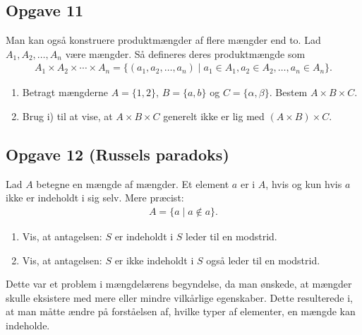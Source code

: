 \subsection*{Opgave 11}
Man kan også konstruere produktmængder af flere mængder end to. Lad $A_1,A_2,\hdots, A_n$ være mængder. Så defineres deres produktmængde som
\begin{align*}
	A_1 \times A_2 \times \cdots \times A_n = \{(a_1,a_2,\hdots,a_n) \mid a_1 \in A_1,a_2\in A_2, \hdots, a_n \in A_n\}.
\end{align*}
\begin{enumerate}[label=\roman*)]
	\item Betragt mængderne $A = \{1,2\}$, $B= \{a,b\}$ og $C = \{\alpha,\beta\}.$ Bestem $A\times B \times C$.
	\item Brug i) til at vise, at $A\times B \times C$ generelt ikke er lig med $(A \times B) \times C$.
\end{enumerate}
\subsection*{Opgave 12 (Russels paradoks)}
Lad $A$ betegne en mængde af mængder. Et element $a$ er i $A$, hvis og kun hvis $a$ ikke er indeholdt i sig selv. Mere præcist:
\begin{align*}
	A = \{a \mid a \notin a\}.
\end{align*}
\begin{enumerate}[label = \roman*)]
	\item Vis, at antagelsen: $S$ er indeholdt i $S$ leder til en modstrid.
	\item Vis, at antagelsen: $S$ er ikke indeholdt i $S$ også leder til en modstrid. 
\end{enumerate}
Dette var et problem i mængdelærens begyndelse, da man ønskede, at mængder skulle eksistere med mere eller mindre vilkårlige egenskaber. Dette resulterede i, at man måtte ændre på forståelsen af, hvilke typer af elementer, en mængde kan indeholde. 
